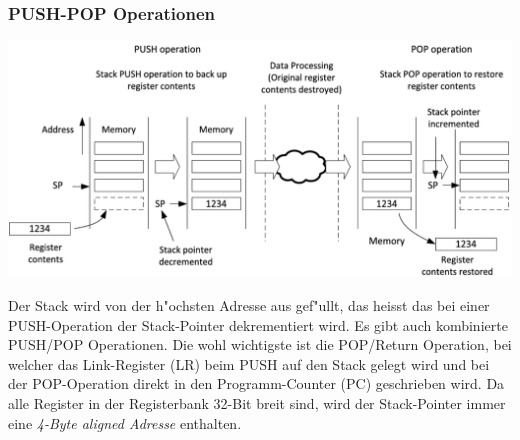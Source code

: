 \subsubsection{PUSH-POP Operationen}
\includegraphics[width=16cm]{images/Stack}

Der Stack wird von der h"ochsten Adresse aus gef"ullt, das heisst das bei einer PUSH-Operation der Stack-Pointer dekrementiert wird. Es gibt auch kombinierte PUSH/POP Operationen. Die wohl wichtigste ist die POP/Return Operation, bei welcher das Link-Register (LR) beim PUSH auf den Stack gelegt wird und bei der POP-Operation direkt in den Programm-Counter (PC) geschrieben wird. Da alle Register in der Registerbank 32-Bit breit sind, wird der Stack-Pointer immer eine \textit{4-Byte aligned Adresse} enthalten.










